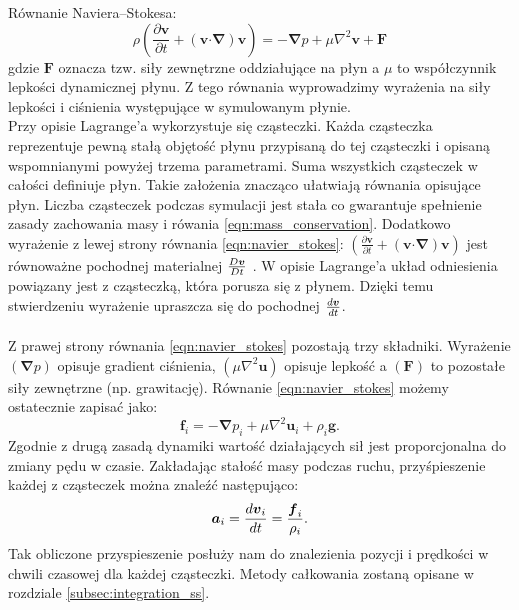 {\sc Równanie Naviera--Stokesa:}
\begin{equation}
\rho \left( \frac{\partial \boldsymbol{v}}{\partial t} + \left( \boldsymbol{v} \boldsymbol{\cdot} \boldsymbol{\nabla} \right) \boldsymbol{v} \right) = -\boldsymbol{\nabla} p + \mu \nabla^{2} \boldsymbol{v} + \boldsymbol{F}
\label{eqn:navier_stokes}
\end{equation}
gdzie $\boldsymbol{F}$ oznacza tzw. siły zewnętrzne oddziałujące na płyn a $\mu$ to współczynnik lepkości dynamicznej płynu. Z tego równania wyprowadzimy wyrażenia na siły lepkości i ciśnienia występujące w symulowanym płynie.\\
Przy opisie Lagrange'a wykorzystuje się cząsteczki. Każda cząsteczka reprezentuje pewną stałą objętość płynu przypisaną do tej cząsteczki i opisaną wspomnianymi powyżej trzema parametrami. Suma wszystkich cząsteczek w całości definiuje płyn. Takie założenia znacząco ułatwiają równania opisujące płyn. Liczba cząsteczek podczas symulacji jest stała co gwarantuje spełnienie zasady zachowania masy i rówania \eqref{eqn:mass_conservation}. Dodatkowo wyrażenie z lewej strony równania \eqref{eqn:navier_stokes}: $\left( \frac{\partial \boldsymbol{v}}{\partial t} + \left( \boldsymbol{v} \boldsymbol{\cdot} \boldsymbol{\nabla} \right) \boldsymbol{v} \right)$ jest równoważne pochodnej materialnej ${D\boldsymbol{v} \over Dt}$ \cite{wiki:1}. W opisie Lagrange'a układ odniesienia powiązany jest z cząsteczką, która porusza się z płynem. Dzięki temu stwierdzeniu wyrażenie upraszcza się do pochodnej ${d\boldsymbol{v} \over dt}$.
\par

\paragraph{}
Z prawej strony równania \eqref{eqn:navier_stokes} pozostają trzy składniki. Wyrażenie $\left( \boldsymbol{\nabla} p \right)$ opisuje gradient ciśnienia, $\left( \mu \nabla^{2} \boldsymbol{u} \right)$ opisuje lepkość a $\left( \boldsymbol{F} \right)$ to pozostałe siły zewnętrzne (np. grawitację). Równanie \eqref{eqn:navier_stokes} możemy ostatecznie zapisać jako:
\begin{equation}
\boldsymbol{f}_i = -\boldsymbol{\nabla} p_i + \mu \nabla^{2} \boldsymbol{u}_i + \rho_i \boldsymbol{g}.
\label{eqn:navier_stokes_lagrangian}
\end{equation}
Zgodnie z drugą zasadą dynamiki wartość działających sił jest proporcjonalna do zmiany pędu w czasie. Zakładając stałość masy podczas ruchu, przyśpieszenie każdej z cząsteczek można znaleźć następująco:
\begin{equation}
\boldsymbol{a}_i = {d\boldsymbol{v}_i \over dt} = {\boldsymbol{f}_i \over \rho_i}.
\label{eqn:acc}
\end{equation}
Tak obliczone przyspieszenie posłuży nam do znalezienia pozycji i prędkości w chwili czasowej dla każdej cząsteczki. Metody całkowania zostaną opisane w rozdziale \eqref{subsec:integration_ss}.
\par

